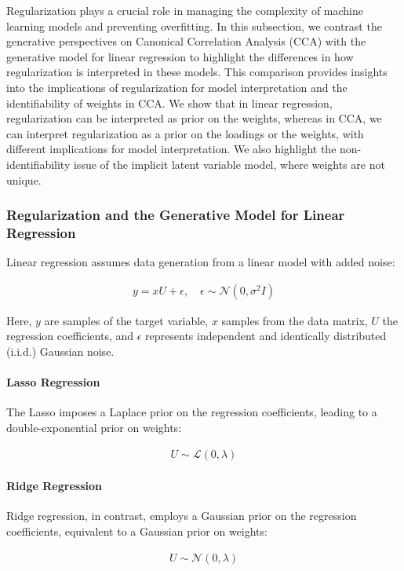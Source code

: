 Regularization plays a crucial role in managing the complexity of machine learning models and preventing overfitting. In this subsection, we contrast the generative perspectives on Canonical Correlation Analysis (CCA) with the generative model for linear regression to highlight the differences in how regularization is interpreted in these models. This comparison provides insights into the implications of regularization for model interpretation and the identifiability of weights in CCA.
We show that in linear regression, regularization can be interpreted as prior on the weights, whereas in CCA, we can interpret regularization as a prior on the loadings or the weights, with different implications for model interpretation.
We also highlight the non-identifiability issue of the implicit latent variable model, where weights are not unique.

\subsubsection{Regularization and the Generative Model for Linear Regression}
Linear regression assumes data generation from a linear model with added noise:

\begin{align}
    y = xU + \epsilon, \quad \epsilon \sim \mathcal{N}(0, \sigma^2 I)
\end{align}

Here, $y$ are samples of the target variable, $x$ samples from the data matrix, $U$ the regression coefficients, and $\epsilon$ represents independent and identically distributed (i.i.d.) Gaussian noise.

\paragraph{Lasso Regression}
The Lasso imposes a Laplace prior on the regression coefficients, leading to a double-exponential prior on weights:

\begin{align}
    U \sim \mathcal{L}(0, \lambda)
\end{align}

\paragraph{Ridge Regression}
Ridge regression, in contrast, employs a Gaussian prior on the regression coefficients, equivalent to a Gaussian prior on weights:

\begin{align}
    U \sim \mathcal{N}(0, \lambda)
\end{align}

